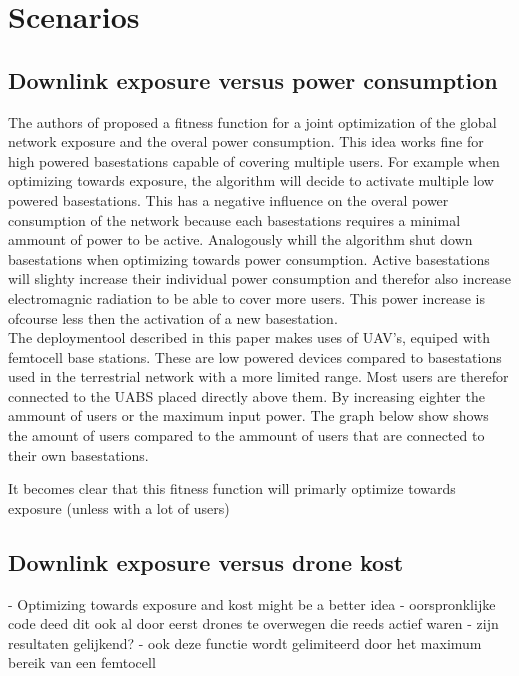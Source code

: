 \chapter{Scenarios}
\label{chap:scenarios}

\section{Downlink exposure versus power consumption}
\label{sec:dlexpvspc}
The authors of \cite{J2} proposed a fitness function for a joint optimization of the global network exposure and the overal power consumption.
This idea works fine for high powered basestations capable of covering multiple users. For example when optimizing towards exposure, the algorithm will decide
to activate multiple low powered basestations. This has a negative influence on the overal power consumption of the network
because each basestations requires a minimal ammount of power to be active. Analogously whill the algorithm shut down basestations when optimizing
towards power consumption. Active basestations will slighty increase their individual power consumption and therefor also increase electromagnic radiation to be able
to cover more users. This power increase is ofcourse less then the activation of a new basestation.\\

The deploymentool described in this paper makes uses of UAV's, equiped with femtocell base stations. These are low powered devices compared to basestations used in the terrestrial network 
with a more limited range. Most users are therefor connected to the \gls{UABS} placed directly above them. By increasing eighter the ammount of users
or the maximum input power. \color{red}The graph below show shows the amount of users compared to the ammount of users that are connected to their own basestations.


It becomes clear that this fitness function will primarly optimize towards exposure (unless with a lot of users)\color{black}





\section{Downlink exposure versus drone kost}
\label{sec:dlexpvspc}

- Optimizing towards exposure and kost might be a better idea
- oorspronklijke code deed dit ook al door eerst drones te overwegen die reeds actief waren
- zijn resultaten gelijkend?
- ook deze functie wordt gelimiteerd door het maximum bereik van een femtocell

